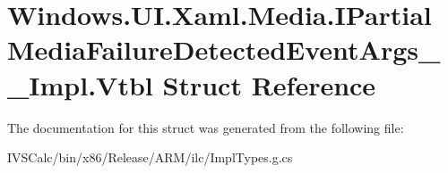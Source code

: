 \hypertarget{struct_windows_1_1_u_i_1_1_xaml_1_1_media_1_1_i_partial_media_failure_detected_event_args_____impl_1_1_vtbl}{}\section{Windows.\+U\+I.\+Xaml.\+Media.\+I\+Partial\+Media\+Failure\+Detected\+Event\+Args\+\_\+\+\_\+\+Impl.\+Vtbl Struct Reference}
\label{struct_windows_1_1_u_i_1_1_xaml_1_1_media_1_1_i_partial_media_failure_detected_event_args_____impl_1_1_vtbl}


The documentation for this struct was generated from the following file\+:\begin{DoxyCompactItemize}
\item 
I\+V\+S\+Calc/bin/x86/\+Release/\+A\+R\+M/ilc/Impl\+Types.\+g.\+cs\end{DoxyCompactItemize}
